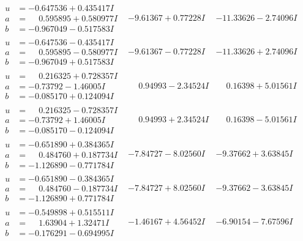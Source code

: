 \documentclass[1p]{elsarticle_modified}
\theoremstyle{definition}
\begin{document}
$$\begin{array}{c|c|c}
\begin{aligned}
u &= -0.647536 + 0.435417 I \\
a &= \phantom{-}0.595895 + 0.580977 I \\
b &= -0.967049 - 0.517583 I\end{aligned}
 & -9.61367 + 0.77228 I & -11.33626 - 2.74096 I \\ \hline\begin{aligned}
u &= -0.647536 - 0.435417 I \\
a &= \phantom{-}0.595895 - 0.580977 I \\
b &= -0.967049 + 0.517583 I\end{aligned}
 & -9.61367 - 0.77228 I & -11.33626 + 2.74096 I \\ \hline\begin{aligned}
u &= \phantom{-}0.216325 + 0.728357 I \\
a &= -0.73792 - 1.46005 I \\
b &= -0.085170 + 0.124094 I\end{aligned}
 & \phantom{-}0.94993 - 2.34524 I & \phantom{-}0.16398 + 5.01561 I \\ \hline\begin{aligned}
u &= \phantom{-}0.216325 - 0.728357 I \\
a &= -0.73792 + 1.46005 I \\
b &= -0.085170 - 0.124094 I\end{aligned}
 & \phantom{-}0.94993 + 2.34524 I & \phantom{-}0.16398 - 5.01561 I \\ \hline\begin{aligned}
u &= -0.651890 + 0.384365 I \\
a &= \phantom{-}0.484760 + 0.187734 I \\
b &= -1.126890 - 0.771784 I\end{aligned}
 & -7.84727 - 8.02560 I & -9.37662 + 3.63845 I \\ \hline\begin{aligned}
u &= -0.651890 - 0.384365 I \\
a &= \phantom{-}0.484760 - 0.187734 I \\
b &= -1.126890 + 0.771784 I\end{aligned}
 & -7.84727 + 8.02560 I & -9.37662 - 3.63845 I \\ \hline\begin{aligned}
u &= -0.549898 + 0.515511 I \\
a &= \phantom{-}1.63904 + 1.32471 I \\
b &= -0.176291 - 0.694995 I\end{aligned}
 & -1.46167 + 4.56452 I & -6.90154 - 7.67596 I \\ \hline\begin{aligned}

\end{aligned}
\end{array}$$
\end{document}
